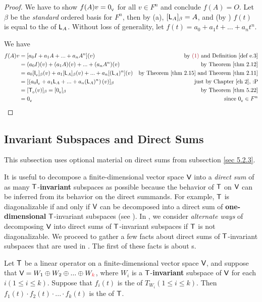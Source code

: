 \begin{proof}
We have to show \(f(A) v = 0_{_{\textsf{V}}}\) for all \(v \in F^n\) and conclude \(f(A) = O\).
Let \(\beta\) be the \emph{standard} ordered basis for \(F^n\), then by (a), \([\textsf{L}_A]_{\beta} = A\), and (by ) \(f(t)\) is equal to the \CPOLY{} of \(\textsf{L}_A\).
Without loss of generality, let \(f(t) = a_0 + a_1 t + ... + a_n t^n\). 

We have
\begin{align*}
    f(A) v & = [a_0 I + a_1 A + ... + a_n A^n](v) & \text{by \MAROON{(1)} and \DEF{e.3}} \\
           & = (a_0 I)(v) + (a_1 A)(v) + ... + (a_n A^n)(v) & \text{by \THM{2.12}} \\
           & = a_0 [\ITRANV{}]_{\beta} (v) + a_1 [\LMTRAN_A]_{\beta} (v) + ... + a_n [(\LMTRAN_A)^n] (v) & \text{by \THM{2.15} and \THM{2.11}} \\
           & = [\left( a_0 \ITRANV{} + a_1 \LMTRAN_A + ... + a_n (\LMTRAN_A)^n \right) (v)]_{\beta} & \text{just by \CH{2}, :P} \\
           & = [\TZERO(v)]_{\beta} = [\OV]_{\beta} & \text{by \THM{5.22}} \\
           & = \OV & \text{since \(\OV \in F^n\)}
\end{align*}
\end{proof}

\subsection{Invariant Subspaces and Direct Sums} \label{sec 5.4.2}
This subsection uses optional material on direct sums from subsection \ref{sec 5.2.3}.

It is useful to decompose a finite-dimensional vector space \(\textsf{V}\) into a \emph{direct sum} of as many \(\textsf{T}\)-\textbf{invariant} subspaces as possible because the behavior of \(\textsf{T}\) on \(\textsf{V}\) can be inferred from its behavior on the direct summands.
For example, \(\textsf{T}\) is diagonalizable if and only if \(\textsf{V}\) can be decomposed into a direct sum of \textbf{one-dimensional} \(\textsf{T}\)-invariant subspaces (see ).
In , we consider \emph{alternate ways} of decomposing \(\textsf{V}\) into direct sums of \(\textsf{T}\)-invariant subspaces if \(\textsf{T}\) is not diagonalizable.
We proceed to gather a few facts about direct sums of \(\textsf{T}\)-invariant subspaces that are used in .
The first of these facts is about \CPOLY{}s.

\begin{theorem} \label{thm 5.23}
Let \(\textsf{T}\) be a linear operator on a finite-dimensional vector space \(\textsf{V}\), and suppose that \(\V = W_1 \oplus W_2 \oplus ... \oplus W_{\RED{k}}\), where \(W_i\) is a \(\textsf{T}\)-\textbf{invariant} subspace of \(\textsf{V}\) for each \(i (1 \le i \le k)\).
Suppose that \(f_i(t)\) is the \CPOLY{} of \(T_{W_i} (1 \le i \le k)\).
Then \(f_1(t) \cdot f_2(t) \cdot ... \cdot f_k(t)\) is the \CPOLY{} of \(\textsf{T}\).
\end{theorem}

